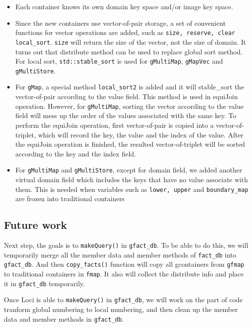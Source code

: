 \documentclass{article}
\begin{document}
\begin{itemize}
\item Each container knows its own domain key space and/or image key space.
\item Since the new containers use vector-of-pair storage, a set of
  convenient functions for vector operations are added, such as
  \texttt{size, reserve, clear local\_sort}. \texttt{size} will return
  the size of the vector, not the size of domain. It turns out that
  distribute method can be used to replace global sort method. For
  local sort, \texttt{std::stable\_sort} is used for \texttt{gMultiMap},
  \texttt{gMapVec} and \texttt{gMultiStore}. 
  \item For \texttt{gMap}, a special
  method \texttt{local\_sort2} is added and it will stable\_sort the
  vector-of-pair according to the value field.  This method is used
  in equiJoin operation. However, for \texttt{gMultiMap}, sorting the
  vector according to the value field will mess up the order of the
  values associated with the same key. To perform the equiJoin
  operation, first vector-of-pair is copied into a vector-of-triplet,
  which will record the key, the value and the index of the
  value. After the  equiJoin
  operation is finished, the resulted vector-of-triplet will be sorted
  according to the key and the index field.
\item For \texttt{gMultiMap} and \texttt{gMultiStore}, except for
  domain field, we added another virtual domain field which includes
  the keys that have no value associate with them. This is needed when
  variables such as \texttt{lower, upper} and \texttt{boundary\_map}
  are frozen into traditional containers 
\end{itemize}  

\subsection{Future work} 
  Next step, the goals is to \texttt{makeQuery()} in \texttt{gfact\_db}. To be able to
  do this, we will temporarily merge all the member data and member methods of
  \texttt{fact\_db} into \texttt{gfact\_db}. And then
  \texttt{copy\_facts()} function will copy all gcontainers from \texttt{gfmap}
  to traditional containers in \texttt{fmap}. It also will collect the
  distribute info and place it in  \texttt{gfact\_db} temporarily. 

  Once Loci is able to \texttt{makeQuery()} in \texttt{gfact\_db}, we
  will work on the part of code tranform global numbering to local numbering, and
  then clean up the member data and member methods in \texttt{gfact\_db}.
  
  
\end{document}

